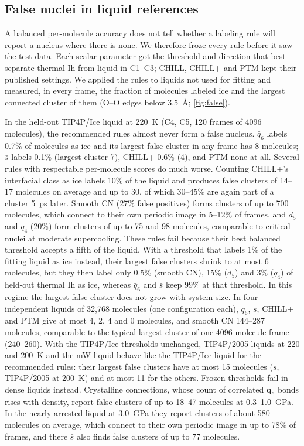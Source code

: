 \documentclass[11pt,a4paper]{article}
\begin{document}
\subsection{False nuclei in liquid references}\label{sec:false}
A balanced per-molecule accuracy does not tell whether a labeling rule will
report a nucleus where there is none. We therefore froze every rule before
it saw the test data. Each scalar parameter got the threshold and direction
that best separate thermal Ih from liquid in C1--C3; CHILL, CHILL+ and PTM kept
their published settings. We applied the rules to liquids not used for
fitting and measured, in every frame, the fraction of molecules labeled ice
and the largest connected cluster of them (O--O edges below 3.5~\AA;
\cref{fig:false}).

In the held-out TIP4P/Ice liquid at 220~K (C4, C5, 120 frames of 4096
molecules), the recommended rules almost never form a false nucleus. $\bar q_6$
labels 0.7\% of molecules as ice and its largest false cluster in any frame
has 8 molecules; $\bar s$ labels 0.1\% (largest cluster 7), CHILL+ 0.6\% (4),
and PTM none at all. Several rules with respectable per-molecule scores do
much worse. Counting CHILL+'s interfacial class as ice labels 10\% of the
liquid and produces false clusters of 14--17 molecules on average and up to
30, of which 30--45\% are again part of a cluster 5~ps later. Smooth CN (27\%
false positives) forms clusters of up to 700 molecules, which connect to their
own periodic image in 5--12\% of frames, and $d_5$ and $\bar q_4$ (20\%) form
clusters of up to 75 and 98 molecules, comparable to critical nuclei at
moderate supercooling. These rules fail because their best balanced
threshold accepts a fifth of the liquid. With a threshold that labels 1\% of
the fitting liquid as ice instead, their largest false clusters shrink to at
most 6 molecules, but they then label only 0.5\% (smooth CN), 15\% ($d_5$)
and 3\% ($\bar q_4$) of held-out thermal Ih as ice, whereas $\bar q_6$ and
$\bar s$ keep 99\% at that threshold. In this regime the largest false
cluster does not grow with system size. In four independent liquids of
32,768 molecules (one configuration each), $\bar q_6$, $\bar s$, CHILL+ and
PTM give at most 4, 2, 4 and 0 molecules, and smooth CN 144--287 molecules,
comparable to the typical largest cluster of one 4096-molecule frame
(240--260). With the TIP4P/Ice thresholds unchanged, TIP4P/2005 liquids at
220 and 200~K and the mW liquid behave like the TIP4P/Ice liquid for the
recommended rules: their largest false clusters have at most 15 molecules
($\bar s$, TIP4P/2005 at 200~K) and at most 11 for the others. Frozen
thresholds fail in dense liquids instead. Crystalline connections, whose
count of correlated $\mathbf q_6$ bonds rises with density, report false
clusters of up to 18--47 molecules at 0.3--1.0~GPa. In the nearly arrested
liquid at 3.0~GPa they report clusters of about 580 molecules on average,
which connect to their own periodic image in up to 78\% of frames, and
there $\bar s$ also finds false clusters of up to 77 molecules.
\end{document}
